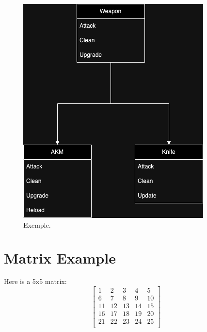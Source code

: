 \documentclass{article}
\begin{document}
\begin{figure}[h]
\begin{minipage}[t]{0.48\linewidth}
            \includegraphics[width=\textwidth]{second}
        \end{minipage}
        \caption{Exemple.}
        \label{fig:my_image}
    \end{figure}

    \section*{Matrix Example}
    Here is a 5x5 matrix:
    \[
        \begin{bmatrix}
            1 & 2 & 3 & 4 & 5 \\
            6 & 7 & 8 & 9 & 10 \\
            11 & 12 & 13 & 14 & 15 \\
            16 & 17 & 18 & 19 & 20 \\
            21 & 22 & 23 & 24 & 25 \\
            \end{bmatrix}
    \]
\end{document}
